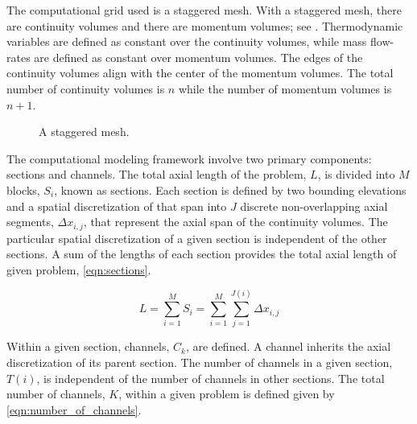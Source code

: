 The computational grid used is a staggered mesh.
With a staggered mesh, there are continuity volumes and there are momentum volumes; see .
Thermodynamic variables are defined as constant over the continuity volumes, while mass flow-rates are defined as constant over momentum volumes.
The edges of the continuity volumes align with the center of the momentum volumes.
The total number of continuity volumes is $n$ while the number of momentum volumes is $n+1$.

\begin{figure}[ht]
\label{fig:staggered_mesh}
\begin{center}
\end{center}
\caption{A staggered mesh.}
\end{figure}

The computational modeling framework involve two primary components: sections and channels.
The total axial length of the problem, $L$, is divided into $M$ blocks, $S_i$, known as sections.
Each section is defined by two bounding elevations and a spatial discretization of that span into $J$ discrete non-overlapping axial segments, $\Delta x_{i,j}$, that represent the axial span of the continuity volumes.
The particular spatial discretization of a given section is independent of the other sections.
A sum of the lengths of each section provides the total axial length of given problem, \eqref{eqn:sections}.

\begin{equation}
\label{eqn:sections}
L = \sum_{i=1}^{M} S_i = \sum_{i=1}^{M}\sum_{j=1}^{J(i)} \Delta x_{i,j}
\end{equation}

Within a given section, channels, $C_{k}$, are defined.
A channel inherits the axial discretization of its parent section.
The number of channels in a given section, $T(i)$, is independent of the number of channels in other sections.
The total number of channels, $K$, within a given problem is defined given by \eqref{eqn:number_of_channels}.

